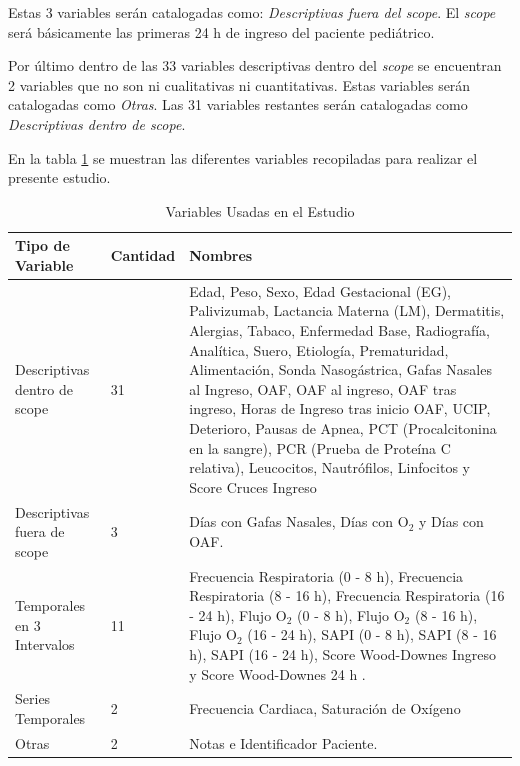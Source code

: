 Estas 3 variables serán catalogadas como: \textit{Descriptivas fuera del scope}. El \textit{scope} será básicamente las primeras 24 h de ingreso del paciente pediátrico.

Por último dentro de las 33 variables descriptivas dentro del \textit{scope} se encuentran 2 variables que no son ni cualitativas ni cuantitativas. Estas variables serán catalogadas como \textit{Otras}. Las 31 variables restantes serán catalogadas como \textit{Descriptivas dentro de scope}.

En la tabla \ref{tabla:variables_estudio} se muestran las diferentes variables recopiladas para realizar el presente estudio. 

\begin{table}[H]
    \centering
        \begin{tabular}{| m{5cm} | m{1.75cm} | m{7cm} |}
            \hline Tipo de Variable & Cantidad & Nombres  \\ \hline
            Descriptivas dentro de scope & 31 & Edad, Peso, Sexo, Edad Gestacional (EG), Palivizumab, Lactancia Materna (LM), Dermatitis, Alergias, Tabaco, Enfermedad Base, Radiografía, Analítica, Suero, Etiología, Prematuridad, Alimentación, Sonda Nasogástrica, Gafas Nasales al Ingreso, OAF, OAF al ingreso, OAF tras ingreso, Horas de Ingreso tras inicio OAF, UCIP, Deterioro, Pausas de Apnea, PCT (Procalcitonina en la sangre), PCR (Prueba de Proteína C relativa), Leucocitos, Nautrófilos, Linfocitos y Score Cruces Ingreso  \\ \hline
            Descriptivas fuera de scope & 3 & Días con Gafas Nasales, Días con O$_2$ y Días con OAF. \\ \hline
            Temporales en 3 Intervalos & 11 & Frecuencia Respiratoria (0 - 8 h), Frecuencia Respiratoria (8 - 16 h),
            Frecuencia Respiratoria (16 - 24 h),
            Flujo O$_2$ (0 - 8 h),
            Flujo O$_2$ (8 - 16 h),
            Flujo O$_2$ (16 - 24 h),
            SAPI (0 - 8 h),
            SAPI (8 - 16 h), 
            SAPI (16 - 24 h), Score Wood-Downes Ingreso y Score Wood-Downes 24 h . \\ \hline
            Series Temporales & 2 & Frecuencia Cardiaca, Saturación de Oxígeno \\ \hline
            Otras & 2 & Notas e Identificador Paciente. \\ \hline
        \end{tabular}
    \caption{Variables Usadas en el Estudio}\label{tabla:variables_estudio}
\end{table}

